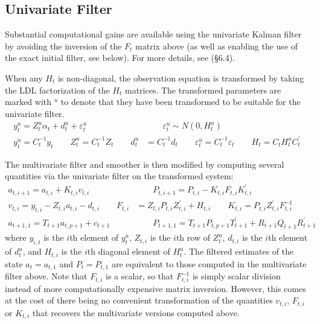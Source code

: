 \documentclass[12pt]{article}
\begin{document}
\subsection{Univariate Filter}
	Substantial computational gains are available using the univariate Kalman filter by avoiding the inversion of the $F_t$ matrix above (as well as enabling the use of the exact initial filter, see below). For more details, see \cite{dk_book} (\S 6.4). 

	When any $H_t$ is non-diagonal, the observation equation is transformed by taking the LDL factorization of the $H_t$ matrices. The transformed parameters are marked with $^u$ to denote that they have been transformed to be suitable for the univariate filter.
	\begin{align*}
	y_t^u = Z_t^u \alpha_t + d_t^u + \varepsilon_t^u &\qquad \varepsilon_t^u \sim N(0, H_t^u)\\
	y_t^u = C_t^{-1} y_t \qquad Z_t^u = C_t^{-1} Z_t \qquad d_t^u &= C_t^{-1} d_t \qquad \varepsilon_t^u = C_t^{-1} \varepsilon_t \qquad H_t = C_t H_t^u C_t^\prime
	\end{align*}

	The multivariate filter and smoother is then modified by computing several quantities via the univariate filter  on the transformed system: 
	\begin{align*}
	a_{t, i+1} = a_{t,i} + K_{t,i} v_{t,i} &\qquad
	 P_{t,i+1} = P_{t,i} - K_{t,i} F_{t,i} K_{t,i}^{\prime} \\
	v_{t,i} = y_{t,i} - Z_{t,i} a_{t,i} - d_{t,i} \qquad
	F_{t,i} &= Z_{t,i} P_{t,i} Z_{t,i}^\prime + H_{t,i} \qquad
	K_{t,i} = P_{t,i} Z_{t,i}^\prime F_{t,i}^{-1} \\ 
	a_{t+1,1} = T_{t+1} a_{t, p+1} + c_{t+1} &\qquad
	P_{t+1,1} = T_{t+1} P_{t,p+1} T_{t+1}^\prime + R_{t+1} Q_{t+1} R_{t+1}^\prime
	\end{align*}
	where $y_{i,t}$ is the $i$th element of $y_t^u$, $Z_{t,i}$ is the $i$th row of $Z_t^u$, $d_{t,i}$ is the $i$th element of $d_t^u$, and $H_{t,i}$ is the $i$th diagonal element of $H_t^u$. The filtered estimates of the state $a_t = a_{t,1}$ and $P_t = P_{t,1}$ are equivalent to those computed in the multivariate filter above. Note that $F_{t,i}$ is a scalar, so that $F_{t,i}^{-1}$ is simply scalar division instead of more computationally expensive matrix inversion. However, this comes at the cost of there being no convenient transformation of the quantities $v_{t,i}$, $F_{t,i}$ or $K_{t,i}$ that recovers the multivariate versions computed above.
\end{document}
